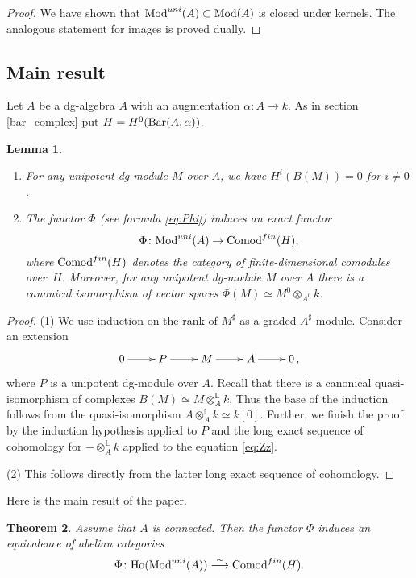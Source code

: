 \documentclass[10pt,russian]{article}
\theoremstyle{plain}
\newtheorem{theorem}{Theorem}[section]
\newtheorem{lemma}[theorem]{Lemma}
\theoremstyle{definition}
\newcommand{\Barr}{{\rm Bar}}
\newcommand{\Mod}{{\rm Mod}}
\newcommand{\Comod}{{\rm Comod}}
\newcommand{\Ho}{{\rm Ho}}
\begin{document}
\begin{proof}
We have shown that $\Mod^{uni}(A)\subset \Mod(A)$ is closed under kernels. The analogous statement for images is proved dually.
\end{proof}

\subsection{Main result}

Let $A$ be a dg-algebra $A$ with an augmentation $\alpha\colon A\to k$. As in section \ref{bar_complex} put $H=H^0(\Barr(A, \alpha))$.

\begin{lemma}\label{lem:Phiexact}
\hspace{0cm}
\begin{enumerate}
\item[(1)]
For any unipotent dg-module $M$ over $A$, we have $H^i(B(M))=0$ for $i\ne 0$.
\item[(2)]
The functor $\Phi$ (see formula \eqref{eq:Phi}) induces an exact functor
$$
\Phi\colon \Mod^{uni}(A)\to \Comod^{fin}(H),
$$
where $\Comod^{fin}(H)$ denotes the category of finite-dimensional comodules over~$H$.	Moreover, for any unipotent dg-module $M$ over $A$ there is a canonical isomorphism of vector spaces $\Phi(M) \simeq M^0 \otimes_{A^0} k$.
\end{enumerate}
\end{lemma}
\begin{proof}
(1)
We use induction on the rank of $M^{\sharp}$ as a graded $A^{\sharp}$-module. Consider an extension
\begin{equation}\label{eq:Zz}
 	\xymatrix{
 		 0 \ar[r] &  P  \ar[r] & M  \ar[r]  &  A \ar[r]& 0\,,
 	}
\end{equation}
where $P$ is a unipotent dg-module over $A$. Recall that there is a canonical quasi-isomorphism of complexes $B(M)\simeq M\otimes^{\mathbb L}_A k$. Thus the base of the induction follows from the quasi-isomorphism ${A\otimes_A^{\mathbb L} k\simeq k[0]}$. Further, we finish the proof by the induction hypothesis applied to $P$ and the long exact sequence of cohomology for $-\otimes_A^{\mathbb L}k$ applied to the equation \ref{eq:Zz}.

(2) This follows directly from the latter long exact sequence of cohomology.
\end{proof}

Here is the main result of the paper.
\begin{theorem}\label{main}
Assume that $A$ is connected. Then the functor $\Phi$ induces an equivalence of abelian categories
$$
\Phi\colon\Ho(\Mod^{uni}(A))\stackrel{\sim}\longrightarrow \Comod^{fin}(H).
$$
\end{theorem}
\end{document}
